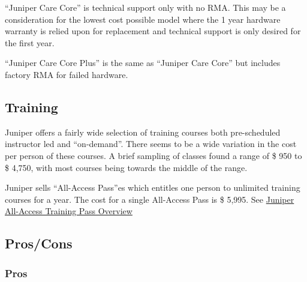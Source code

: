 “Juniper Care Core” is technical support only with no RMA.  This may be a consideration for the lowest cost possible model where the 1 year hardware warranty is relied upon for replacement and technical support is only desired for the first year.

“Juniper Care Core Plus” is the same as “Juniper Care Core” but includes factory RMA for failed hardware.


\subsection{Training}

Juniper offers a fairly wide selection of training courses both pre-scheduled instructor led and “on-demand”.  There seems to be a wide variation in the cost per person of these courses.  A brief sampling of classes found a range of \$ 950 to \$ 4,750, with most courses being towards the middle of the range.

Juniper sells “All-Access Pass”es which entitles one person to unlimited training courses for a year.  The cost for a single All-Access Pass is \$ 5,995. See \href{https://learningportal.juniper.net/juniper/user_activity_info.aspx?id=ALL-ACCESS-TRAINING-PASS-HOME}{Juniper All-Access Training Pass Overview}

\subsection{{Pros/Cons}}
\subsubsection{Pros}

